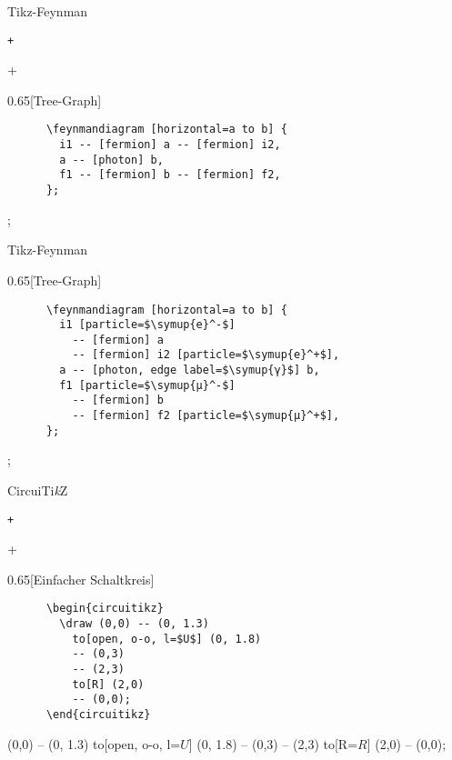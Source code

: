 \begin{frame}[fragile]{%
  Tikz-Feynman
  \hfill
}
  \begin{Packages}
    \texttt+\usepackage{tikz-feynman}+
  \end{Packages}
  \begin{CodeExample}{0.65}[Tree-Graph]
    \begin{verbatim}
      \feynmandiagram [horizontal=a to b] {
        i1 -- [fermion] a -- [fermion] i2,
        a -- [photon] b,
        f1 -- [fermion] b -- [fermion] f2,
      };
    \end{verbatim}
  \CodeResult
    ;
  \end{CodeExample}
\end{frame}

\begin{frame}[fragile]{Tikz-Feynman}
  \begin{CodeExample}{0.65}[Tree-Graph]
    \begin{verbatim}
      \feynmandiagram [horizontal=a to b] {
        i1 [particle=$\symup{e}^-$]
          -- [fermion] a
          -- [fermion] i2 [particle=$\symup{e}^+$],
        a -- [photon, edge label=$\symup{γ}$] b,
        f1 [particle=$\symup{μ}^-$]
          -- [fermion] b
          -- [fermion] f2 [particle=$\symup{μ}^+$],
      };
    \end{verbatim}
  \CodeResult
    ;
  \end{CodeExample}
\end{frame}

\begin{frame}[fragile]{%
  CircuiTi\textit{k}Z
  \hfill
}
  \begin{Packages}
    \texttt+\usepackage[siunitx]{circuitikz}+
  \end{Packages}
  \begin{CodeExample}{0.65}[Einfacher Schaltkreis]
    \begin{verbatim}
      \begin{circuitikz}
        \draw (0,0) -- (0, 1.3)
          to[open, o-o, l=$U$] (0, 1.8)
          -- (0,3)
          -- (2,3)
          to[R] (2,0)
          -- (0,0);
      \end{circuitikz}
    \end{verbatim}
  \CodeResult
    \begin{circuitikz}
      \draw (0,0) -- (0, 1.3)
          to[open, o-o, l=$U$] (0, 1.8)
          -- (0,3) -- (2,3)
          to[R=$R$] (2,0)
          -- (0,0);
      \end{circuitikz}
  \end{CodeExample}
\end{frame}

